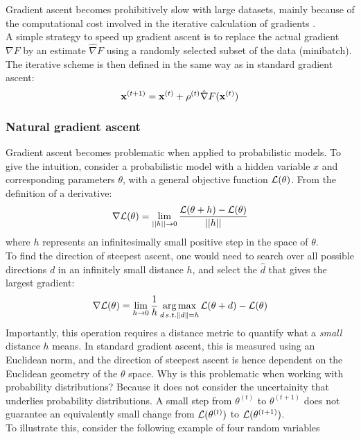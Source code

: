 Gradient ascent becomes prohibitively slow with large datasets, mainly because of the computational cost involved in the iterative calculation of gradients \cite{Spall2003}.\\
A simple strategy to speed up gradient ascent is to replace the actual gradient $\nabla F$ by an estimate $\hat{\nabla} F$ using a randomly selected subset of the data (minibatch).
The iterative scheme is then defined in the same way as in standard gradient ascent:
\begin{equation}
	{\bf x}^{(t+1)} = {\bf x}^{(t)} + \rho^{(t)} \hat{\nabla} F({\bf x}^{(t)})
\end{equation}




\subsubsection{Natural gradient ascent} \label{section:natural_gradient_ascent}

Gradient ascent becomes problematic when applied to probabilistic models. To give the intuition, consider a probabilistic model with a hidden variable $x$ and corresponding parameters $\theta$, with a general objective function $\mathcal{L}(\theta)$. From the definition of a derivative:
\[
	\nabla \mathcal{L}(\theta) = \lim_{||h||\to0} \frac{\mathcal{L}(\theta + h) - \mathcal{L}(\theta)}{||h||}
\]
where $h$ represents an infinitesimally small positive step in the space of $\theta$.\\
To find the direction of steepest ascent, one would need to search over all possible directions $d$ in an infinitely small distance $h$, and select the $\hat{d}$ that gives the largest gradient:
\[
\nabla \mathcal{L}(\theta) = \lim_{h\to0} \frac{1}{h}\operatorname*{arg\,max}_{d \, s.t. \|d\|=h} \mathcal{L}(\theta+d) - \mathcal{L}(\theta)
\]
Importantly, this operation requires a distance metric to quantify what a \textit{small} distance $h$ means. In standard gradient ascent, this is measured using an Euclidean norm, and the direction of steepest ascent is hence dependent on the Euclidean geometry of the $\theta$ space. Why is this problematic when working with probability distributions? Because it does not consider the uncertainity that underlies probability distributions. A small step from $\theta^{(t)}$ to $\theta^{(t+1)}$ does not guarantee an equivalently small change from $\mathcal{L}(\theta^{(t)})$ to $\mathcal{L}(\theta^{(t+1)})$.\\
To illustrate this, consider the following example of four random variables

